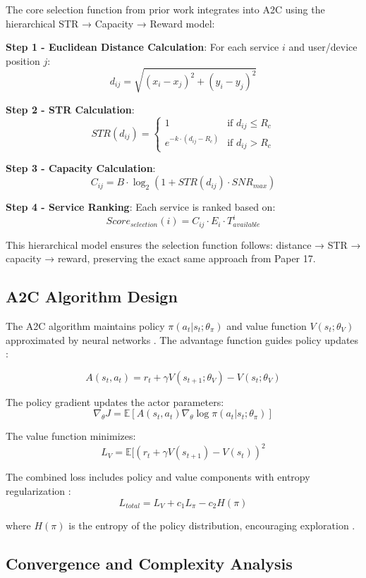 \documentclass[10pt,twocolumn]{article}
\begin{document}
The core selection function from prior work integrates into A2C using
the hierarchical STR → Capacity → Reward model:

\textbf{Step 1 - Euclidean Distance Calculation}: For each service \(i\)
and user/device position \(j\):
\[d_{ij} = \sqrt{(x_i - x_j)^2 + (y_i - y_j)^2}\]

\textbf{Step 2 - STR Calculation}:
\[STR(d_{ij}) = \begin{cases} 1 & \text{if } d_{ij} \leq R_c \\ e^{-k \cdot (d_{ij} - R_c)} & \text{if } d_{ij} > R_c \end{cases}\]

\textbf{Step 3 - Capacity Calculation}:
\[C_{ij} = B \cdot \log_2(1 + STR(d_{ij}) \cdot SNR_{max})\]

\textbf{Step 4 - Service Ranking}: Each service is ranked based on:
\[Score_{selection}(i) = C_{ij} \cdot E_i \cdot T_{available}^i\]

This hierarchical model ensures the selection function follows: distance
→ STR → capacity → reward, preserving the exact same approach from Paper
17.

\subsection{A2C Algorithm Design}\label{a2c-algorithm-design}

The A2C algorithm maintains policy \(\pi(a_t|s_t; \theta_\pi)\) and
value function \(V(s_t; \theta_V)\) approximated by neural networks \nocite{mnih2016}. The
advantage function guides policy updates \nocite{sutton2018}:

\[A(s_t, a_t) = r_t + \gamma V(s_{t+1}; \theta_V) - V(s_t; \theta_V)\]

The policy gradient updates the actor parameters:
\[\nabla_\theta J = \mathbb{E}[A(s_t, a_t) \nabla_\theta \log \pi(a_t|s_t; \theta_\pi)]\]

The value function minimizes:
\[L_V = \mathbb{E}[(r_t + \gamma V(s_{t+1}) - V(s_t))^2\]

The combined loss includes policy and value components with entropy
regularization \nocite{mnih2016}: \[L_{total} = L_V + c_1 L_\pi - c_2 H(\pi)\]

where \(H(\pi)\) is the entropy of the policy distribution, encouraging
exploration \nocite{sutton2018}.

\subsection{Convergence and Complexity Analysis}\label{convergence-and-complexity-analysis}
\end{document}
